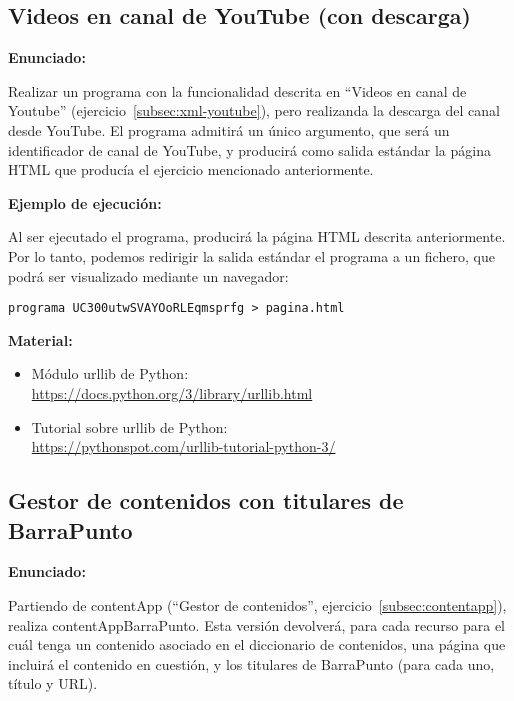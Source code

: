 \subsection{Videos en canal de YouTube (con descarga)}
\label{subsec:xml-youtube-descarga}

\textbf{Enunciado:}

Realizar un programa con la funcionalidad descrita en ``Videos en canal de Youtube'' (ejercicio~\ref{subsec:xml-youtube}), pero realizanda la descarga del canal desde YouTube. El programa admitirá un único argumento, que será un identificador de canal de YouTube, y producirá como salida estándar la página HTML que producía el ejercicio mencionado anteriormente.

\textbf{Ejemplo de ejecución:}

Al ser ejecutado el programa, producirá la página HTML descrita anteriormente. Por lo tanto, podemos redirigir la salida estándar el programa a un fichero, que podrá ser visualizado mediante un navegador:

\begin{verbatim}
programa UC300utwSVAYOoRLEqmsprfg > pagina.html
\end{verbatim}

\textbf{Material:}

\begin{itemize}
\item Módulo urllib de Python: \\
  \url{https://docs.python.org/3/library/urllib.html}
\item Tutorial sobre urllib de Python: \\
  \url{https://pythonspot.com/urllib-tutorial-python-3/}
\end{itemize}

\subsection{Gestor de contenidos con titulares de BarraPunto}
\label{subsec:contentapp-barrapunto}

\textbf{Enunciado:}

Partiendo de contentApp (``Gestor de contenidos'', ejercicio~\ref{subsec:contentapp}), realiza contentAppBarraPunto. Esta versión devolverá, para cada recurso para el cuál tenga un contenido asociado en el diccionario de contenidos, una página que incluirá el contenido en cuestión, y los titulares de BarraPunto (para cada uno, título y URL).

